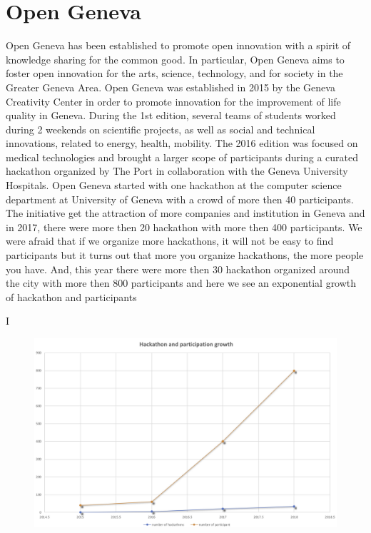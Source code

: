 \section{Open Geneva}
Open Geneva has been established to promote open innovation with a spirit of knowledge sharing for the common good. In particular, Open Geneva aims to foster open innovation for the arts, science, technology, and for society in the Greater Geneva Area. Open Geneva was established in 2015 by the Geneva Creativity Center in order to promote innovation for the improvement of life quality in Geneva. During the 1st edition, several teams of students worked during 2 weekends on scientific projects, as well as social and technical innovations, related to energy, health, mobility. The 2016 edition was focused on medical technologies and brought a larger scope of participants during a curated hackathon organized by The Port in collaboration with the Geneva University Hospitals\cite{web:opengeneva}.
Open Geneva started with one hackathon at the computer science department at University of Geneva with a crowd of more then 40 participants. The initiative get the attraction of more companies and institution in Geneva and in 2017, there were more then 20 hackathon with more then 400 participants. We were afraid that if we organize more hackathons, it will not be easy to find participants but it turns out that more you organize hackathons, the more people you have. And, this year there were more then 30 hackathon organized around the city with more then 800 participants and here we see an exponential growth of hackathon and participants

I\begin{figure}[H]
	\centering
	\includegraphics[scale=.4]{./images/img-hackstat.png}
	\label{img-hackstat}
	\caption{}
\end{figure}


